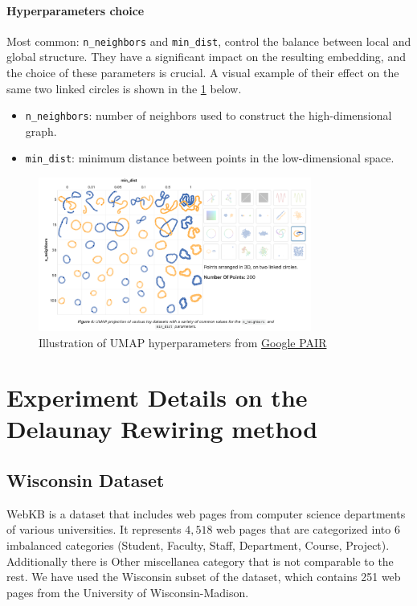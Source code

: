 \documentclass{article}
\theoremstyle{plain}
\theoremstyle{definition}
\theoremstyle{remark}
\begin{document}
\paragraph{Hyperparameters choice}
Most common: \texttt{n\_neighbors} and \texttt{min\_dist}, control the balance between local and global structure.
They have a significant impact on the resulting embedding, and the choice of these parameters is crucial.
A visual example of their effect on the same two linked circles is shown in the \cref{fig:umap_hyperparam} below.
\begin{itemize}
    \item \texttt{n\_neighbors}: number of neighbors used to construct the high-dimensional graph.
    \item \texttt{min\_dist}: minimum distance between points in the low-dimensional space.
\end{itemize}
\begin{figure}[ht!]
    \center
    \includegraphics[width=0.8\textwidth]{figures/UMAP_hyperparam.png}
    \caption{\scriptsize Illustration of UMAP hyperparameters from 
        \href{https://pair-code.github.io/understanding-umap/index.html}{Google PAIR}}
    \label{fig:umap_hyperparam}
\end{figure}

\section{Experiment Details on the Delaunay Rewiring method}
\subsection{Wisconsin Dataset}
WebKB is a dataset that includes web pages from computer science departments of 
various universities. It represents $4,518$ web pages that are categorized into 6 imbalanced categories 
(Student, Faculty, Staff, Department, Course, Project). Additionally there is 
Other miscellanea category that is not comparable to the rest. We have used the
Wisconsin subset of the dataset, which contains 251 web pages from the University of Wisconsin-Madison.
\end{document}
